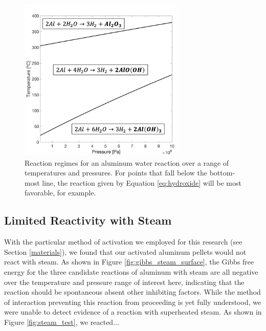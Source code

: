 \documentclass[preprint,12pt,3p]{elsarticle}
\begin{document}
\begin{figure}
  \centering
  \includegraphics[width=0.7\textwidth]{fig/transitions}
  \caption{Reaction regimes for an aluminum water reaction over a range of
  temperatures and pressures. For points that fall below the bottom-most line,
the reaction given by Equation \ref{eq:hydroxide} will be most favorable, for
example.}
  \label{fig:transitions}
\end{figure}

\subsection{Limited Reactivity with Steam}

With the particular method of activation we employed for this research (see
Section \ref{materials}), we found that our activated aluminum pellets would not
react with steam. As shown in Figure \ref{fig:gibbs_steam_surface}, the Gibbs
free energy for the three candidate reactions of aluminum with steam are all
negative over the temperature and pressure range of interest here, indicating
that the reaction should be spontaneous absent other inhibiting factors.  While
the method of interaction preventing this reaction from proceeding is yet fully
understood, we were unable to detect evidence of a reaction with superheated
steam. As shown in Figure \ref{fig:steam_test}, we reacted...
\end{document}
